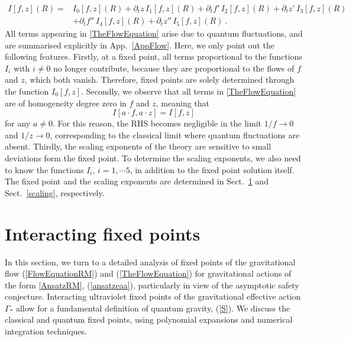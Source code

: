 \documentclass[notitlepage,eqsecnum,bm,amsmath,preprintnumbers,superscriptaddress,nofootinbib,aps,11pt]{revtex4-1}
\def\eq#1{(\ref{#1})}
\def\R{\rho}
\def\R{R}
\def\beq{\begin{equation}}
\def\eeq{\end{equation}}
\begin{document}
\begin{equation}
\begin{split}
I[f,z](\R)=&I_0[f,z](\R)+\partial_tz\,I_1[f,z](\R)+\partial_tf'\,I_2[f,z](\R)+\partial_tz'\,I_3[f,z](\R)\\
&+\partial_tf''\,I_4[f,z](\R)+\partial_tz''\,I_5[f,z](\R)\ .\label{TheFlowEquation}
\end{split}
\end{equation}
All terms appearing in \eqref{TheFlowEquation} arise due to quantum fluctuations, and are summarised explicitly in App.~\ref{AppFlow}. Here, we only point out the following features. Firstly, at a fixed point, all terms proportional to the functions $I_i$ with $i\neq 0$ no longer contribute, because they are proportional to the flows of $f$ and $z$, which both vanish. Therefore, fixed points are solely determined through the function $I_0[f,z]$. Secondly, we observe that all terms in \eqref{TheFlowEquation}  are of homogeneity degree zero in $f$ and $z$, meaning that 
\beq\label{homo}
I[a\cdot f,a\cdot z]=I[f,z]
\eeq
for any $a\neq 0$. For this reason, the RHS becomes negligible in the limit $1/f\to 0$ and $1/z\to 0$, corresponding to the classical limit where quantum fluctuations are absent. Thirdly, the scaling exponents of the theory are sensitive to small deviations form the fixed point. To determine the scaling exponents, we also need to know the functions  $I_i$, $i=1,\cdots 5$, in addition to the fixed point solution itself. The fixed point and the scaling exponents are determined in Sect.~\ref{fixedpoints} and Sect.~\ref{scaling}, respectively.









\section{\bf Interacting fixed points}\label{fixedpoints}


In this section, we turn to a detailed analysis of fixed points of the gravitational flow \eq{FlowEquationRM} and \eq{TheFlowEquation}
for gravitational actions of the form \eqref{AnsatzRM}, \eq{ansatzeaa}, particularly  in view of the asymptotic safety conjecture. Interacting ultraviolet fixed points of the gravitational effective action $\Gamma_*$ allow for a fundamental definition of quantum gravity, \eq{S}. We discuss the classical and quantum fixed points, using polynomial expansions and numerical integration techniques.
\end{document}
